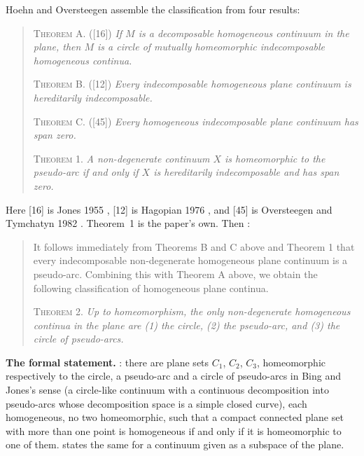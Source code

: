 \documentclass[11pt]{article}
\begin{document}
Hoehn and Oversteegen \cite[pp.~179--180]{HO16} assemble the classification from four results:
\begin{quote}
\textsc{Theorem A.} ([16]) \emph{If $M$ is a decomposable homogeneous continuum in the plane,
then $M$ is a circle of mutually homeomorphic indecomposable homogeneous continua.}

\textsc{Theorem B.} ([12]) \emph{Every indecomposable homogeneous plane continuum is hereditarily
indecomposable.}

\textsc{Theorem C.} ([45]) \emph{Every homogeneous indecomposable plane continuum has span zero.}

\textsc{Theorem 1.} \emph{A non-degenerate continuum $X$ is homeomorphic to the pseudo-arc if and
only if $X$ is hereditarily indecomposable and has span zero.}
\end{quote}
Here [16] is Jones 1955 \cite{J55}, [12] is Hagopian 1976 \cite{H76}, and [45] is Oversteegen and
Tymchatyn 1982 \cite{OT82}. Theorem~1 is the paper's own. Then \cite[p.~180]{HO16}:
\begin{quote}
It follows immediately from Theorems B and C above and Theorem 1 that every indecomposable
non-degenerate homogeneous plane continuum is a pseudo-arc. Combining this with Theorem A above,
we obtain the following classification of homogeneous plane continua.

\textsc{Theorem 2.} \emph{Up to homeomorphism, the only non-degenerate homogeneous continua in the
plane are (1) the circle, (2) the pseudo-arc, and (3) the circle of pseudo-arcs.}
\end{quote}

\textbf{The formal statement.} : there are plane sets $C_1$,
$C_2$, $C_3$, homeomorphic respectively to the circle, a pseudo-arc and a circle of pseudo-arcs in
Bing and Jones's sense (a circle-like continuum with a continuous decomposition into pseudo-arcs
whose decomposition space is a simple closed curve), each homogeneous, no two homeomorphic, such
that a compact connected plane set with more than one point is homogeneous if and only if it is
homeomorphic to one of them.  states the same for a continuum given as
a subspace of the plane.
\end{document}
